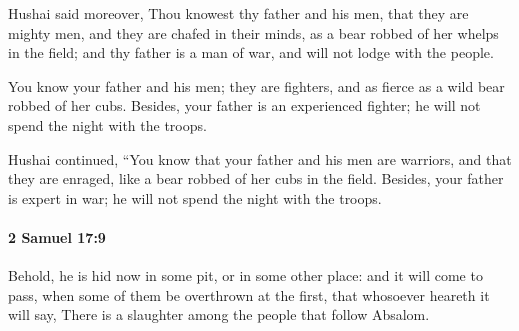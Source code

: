 			\begin{versebox}
					\item[BHS] 
					\item[ASV] Hushai said moreover, Thou knowest thy father and his men, that they are mighty men, and they are chafed in their minds, as a bear robbed of her whelps in the field; and thy father is a man of war, and will not lodge with the people.
					\item[NIV] You know your father and his men; they are fighters, and as fierce as a wild bear robbed of her cubs. Besides, your father is an experienced fighter; he will not spend the night with the troops.
					\item[NRSV] Hushai continued, “You know that your father and his men are warriors, and that they are enraged, like a bear robbed of her cubs in the field. Besides, your father is expert in war; he will not spend the night with the troops.
			\end{versebox}

		\paragraph{2 Samuel 17:9} %
			\label{2SAMUEL-17-9}

			Behold, he is hid now in some pit, or in some other place: and it will come to pass, when some of them be overthrown at the first, that whosoever heareth it will say, There is a slaughter among the people that follow Absalom.

